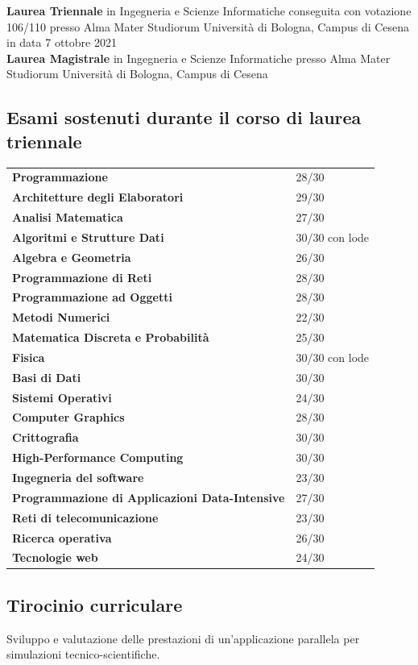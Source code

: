 \documentclass{article}
\newcommand{\years}[1]{\marginnote{\small #1}} %
\begin{document}
	\years{2018 - 2021} \textbf{Laurea Triennale} in Ingegneria e Scienze Informatiche conseguita con votazione 106/110 presso Alma Mater Studiorum Università di Bologna, Campus di Cesena in data 7 ottobre 2021\\
	
	\years{2021 - oggi} \textbf{Laurea Magistrale} in Ingegneria e Scienze Informatiche presso Alma Mater Studiorum Università di Bologna, Campus di Cesena
	
	\subsection*{Esami sostenuti durante il corso di laurea triennale}
	\begin{tabular}{ll}
		\textbf{Programmazione} & 28/30\\
		\textbf{Architetture degli Elaboratori} & 29/30\\
		\textbf{Analisi Matematica} & 27/30\\
		\textbf{Algoritmi e Strutture Dati} & 30/30 con lode\\
		\textbf{Algebra e Geometria} & 26/30\\
		\textbf{Programmazione di Reti} & 28/30\\
		\textbf{Programmazione ad Oggetti} & 28/30\\
		\textbf{Metodi Numerici} & 22/30\\
		\textbf{Matematica Discreta e Probabilità} & 25/30\\
		\textbf{Fisica} & 30/30 con lode\\
		\textbf{Basi di Dati} & 30/30\\
		\textbf{Sistemi Operativi} & 24/30\\
		\textbf{Computer Graphics} & 28/30\\
		\textbf{Crittografia} & 30/30\\
		\textbf{High-Performance Computing} & 30/30\\
		\textbf{Ingegneria del software} & 23/30\\
		\textbf{Programmazione di Applicazioni Data-Intensive} & 27/30\\
		\textbf{Reti di telecomunicazione} & 23/30\\
		\textbf{Ricerca operativa} & 26/30\\
		\textbf{Tecnologie web} & 24/30\\
	\end{tabular}

	\subsection*{Tirocinio curriculare}
	Sviluppo e valutazione delle prestazioni di un'applicazione parallela per simulazioni tecnico-scientifiche.
	
\end{document}
